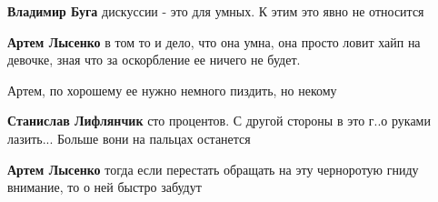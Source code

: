 \begin{itemize}
\begin{itemize}
 
\textbf{Владимир Буга} дискуссии - это для умных. К этим это явно не относится

 
\textbf{Артем Лысенко} в том то и дело, что она умна, она просто ловит хайп на девочке, зная что за оскорбление ее ничего не будет.
\end{itemize}

 
Артем, по хорошему ее нужно немного пиздить, но некому 🤣

\begin{itemize}
 
\textbf{Станислав Лифлянчик} сто процентов. С другой стороны в это г..о руками лазить... Больше вони на пальцах останется

 
\textbf{Артем Лысенко} тогда если перестать обращать на эту черноротую гниду внимание, то о ней быстро забудут

 

\end{itemize}
\end{itemize}
